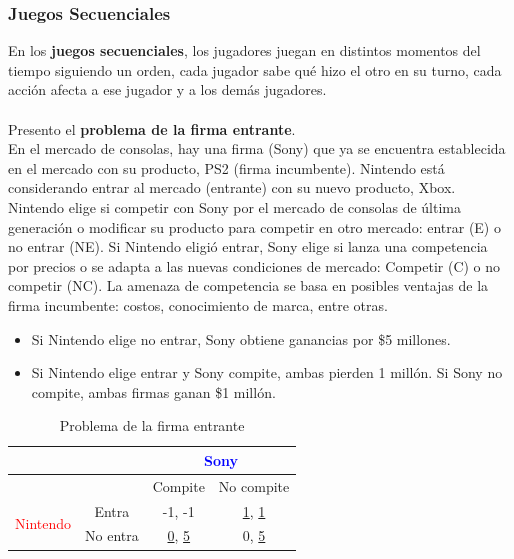 \documentclass{article}
\newcommand{\ulcolor}[2][Red]{\setulcolor{#1}\ul{#2}}
\begin{document}
            \subsubsection*{Juegos Secuenciales}
                En los \textbf{juegos secuenciales}, los jugadores juegan en distintos momentos del tiempo siguiendo un orden, cada jugador sabe qué hizo el otro en su turno, cada acción afecta a ese jugador y a los demás jugadores. \\
                \\
                Presento el \textbf{problema de la firma entrante}. \\
                En el mercado de consolas, hay una firma (Sony) que ya se encuentra establecida en el mercado con su producto, PS2 (firma incumbente). Nintendo está considerando entrar al mercado (entrante) con su nuevo producto, Xbox. Nintendo elige si competir con Sony por el mercado de consolas de última generación o modificar su producto para competir en otro mercado: entrar (E) o no entrar (NE). Si Nintendo eligió entrar, Sony elige si lanza una competencia por precios o se adapta a las nuevas condiciones de mercado: Competir (C) o no competir (NC). La amenaza de competencia se basa en posibles ventajas de la firma incumbente: costos, conocimiento de marca, entre otras.
                \begin{itemize}
                    \item Si Nintendo elige no entrar, Sony obtiene ganancias por \$5 millones.
                    \item Si Nintendo elige entrar y Sony compite, ambas pierden 1 millón. Si Sony no compite, ambas firmas ganan \$1 millón.
                \end{itemize}
                \begin{table}[H]
                    \centering
                        \begin{tabular}{|c|c|c|c|}
                        \hline
                        & & \multicolumn{2}{c|}{\textcolor{Blue}{Sony}} \\ \hline
                                                & & Compite & No compite \\ \hline
                        \multirow{2}{*}{\textcolor{Red}{Nintendo}} 
                                                & Entra & -1, -1 & \ulcolor[red]{1}, \ulcolor[blue]{1} \\ \cline{2-4} 
                                                & No entra & \ulcolor[red]{0}, \ulcolor[blue]{5} & 0, \ulcolor[blue]{5} \\ \hline
                        \end{tabular}
                    \caption{Problema de la firma entrante}
                \end{table}
\end{document}
